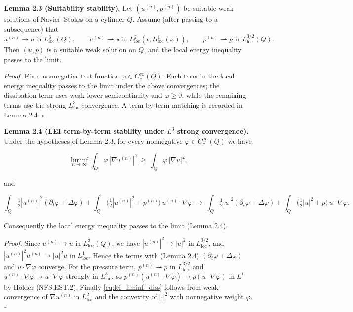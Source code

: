 \documentclass[
  11pt,
]{article}
\begin{document}
\textbf{Lemma 2.3 (Suitability stability).} Let \((u^{(n)},p^{(n)})\) be suitable weak solutions of Navier--Stokes on a cylinder \(Q\). Assume (after passing to a subsequence) that \[
u^{(n)}\to u \ \text{in }L^3_{\mathrm{loc}}(Q),\qquad 
u^{(n)}\rightharpoonup u \ \text{in }L^2_{\mathrm{loc}}(t;H^1_{\mathrm{loc}}(x)),\qquad
p^{(n)}\rightharpoonup p \ \text{in }L^{3/2}_{\mathrm{loc}}(Q).
\] Then \((u,p)\) is a suitable weak solution on \(Q\), and the local energy inequality passes to the limit.

\emph{Proof.} Fix a nonnegative test function \(\varphi\in C_c^\infty(Q)\). Each term in the local energy inequality passes to the limit under the above convergences; the dissipation term uses weak lower semicontinuity and \(\varphi\ge 0\), while the remaining terms use the strong \(L^3_{\mathrm{loc}}\) convergence. A term-by-term matching is recorded in Lemma 2.4. \(\square\)

\textbf{Lemma 2.4 (LEI term-by-term stability under \(L^3\) strong convergence).} Under the hypotheses of Lemma 2.3, for every nonnegative \(\varphi\in C_c^\infty(Q)\) we have

\begin{equation}
\liminf_{n\to\infty}\int_Q \varphi\,|\nabla u^{(n)}|^2
\ \ge\ \int_Q \varphi\,|\nabla u|^2,
\tag{2.4a}\label{eq:lei_liminf_diss}
\end{equation}

and

\begin{equation}
\int_Q \tfrac12|u^{(n)}|^2(\partial_t\varphi+\Delta\varphi)
+ \int_Q \Big(\tfrac12|u^{(n)}|^2 + p^{(n)}\Big)\,u^{(n)}\cdot\nabla\varphi
\ \longrightarrow\
\int_Q \tfrac12|u|^2(\partial_t\varphi+\Delta\varphi)
+ \int_Q \Big(\tfrac12|u|^2 + p\Big)\,u\cdot\nabla\varphi.
\tag{2.4b}\label{eq:lei_conv_nonlinear_pressure}
\end{equation}

Consequently the local energy inequality passes to the limit (Lemma 2.4).

\emph{Proof.} Since \(u^{(n)}\to u\) in \(L^3_{\mathrm{loc}}(Q)\), we have \(|u^{(n)}|^2\to |u|^2\) in \(L^{3/2}_{\mathrm{loc}}\), and \(|u^{(n)}|^2u^{(n)}\to |u|^2u\) in \(L^1_{\mathrm{loc}}\). Hence the terms with (Lemma 2.4) \((\partial_t\varphi+\Delta\varphi)\) and \(u\cdot\nabla\varphi\) converge. For the pressure term, \(p^{(n)}\rightharpoonup p\) in \(L^{3/2}_{\mathrm{loc}}\) and \(u^{(n)}\cdot\nabla\varphi\to u\cdot\nabla\varphi\) strongly in \(L^3_{\mathrm{loc}}\), so \(p^{(n)}(u^{(n)}\cdot\nabla\varphi)\to p(u\cdot\nabla\varphi)\) in \(L^1\) by Hölder (NFS.EST.2). Finally \eqref{eq:lei_liminf_diss} follows from weak convergence of \(\nabla u^{(n)}\) in \(L^2_{\mathrm{loc}}\) and the convexity of \(|\cdot|^2\) with nonnegative weight \(\varphi\). \(\square\)
\end{document}
